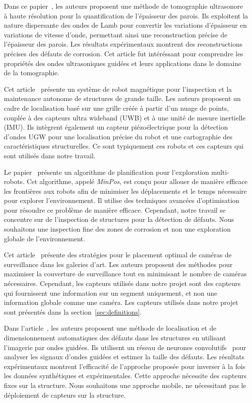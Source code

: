\documentclass[francais,RandD]{rapportPFE}
\begin{document}
		Dans ce papier~\cite{HUTHWAITE2013979}, les auteurs proposent une méthode de tomographie ultrasonore à haute résolution pour la quantification de l'épaisseur des parois.
		Ils exploitent la nature dispersante des ondes de Lamb pour convertir les variations d'épaisseur en variations de vitesse d'onde, permettant ainsi une reconstruction précise de l'épaisseur des parois.
		Les résultats expérimentaux montrent des reconstructions précises des défauts de corrosion.
		Cet article fut intéréssant pour comprendre les propriétés des ondes ultrasoniques guidées et leurs applications dans le domaine de la tomographie.

		Cet article~\cite{s22093235} présente un système de robot magnétique pour l'inspection et la maintenance autonome de structures de grande taille.
		Les auteurs proposent un cadre de localisation basé sur une grille créée à partir d'un nuage de points, couplée à des capteurs ultra wideband (UWB) et à une unité de mesure inertielle (IMU).
		Ils intègrent également un capteur piézoélectrique pour la détection d'ondes UGW pour une localisation précise du robot et une cartographie des caractéristiques structurelles.
		Ce sont typiquement ces robots et ces capteurs qui sont utilisés dans notre travail.

		Le papier~\cite{bautin:hal-00757960} présente un algorithme de planification pour l'exploration multi-robots.
		Cet algorithme, appelé \textit{MinPos}, est conçu pour allouer de manière efficace les frontières aux robots afin de minimiser les déplacements et le temps nécessaire pour explorer l'environnement. Il utilise des techniques avancées d'optimisation pour résoudre ce problème de manière efficace.
		Cependant, notre travail se concentre sur de l'inspection de structures pour la détection de défauts.
		Nous souhaitons une inspection fine des zones de corrosion et non une exploration globale de l'environnement.

		Cet article~\cite{article455556} présente des stratégies pour le placement optimal de caméras de surveillance dans les galeries d'art.
		Les auteurs proposent des méthodes pour maximiser la couverture de surveillance tout en minimisant le nombre de caméras nécessaires.
		Cependant, les capteurs utilisés dans notre projet sont des capteurs qui fournissent une information sur un segment uniquement, et non une information globale comme une caméra.
		Les capteurs utilisés dans notre projet sont présentés dans la section~\ref{sec:definitions}.

		Dans l'article~\cite{articlesvsdf}, les auteurs proposent une méthode de localisation et de dimensionnement automatiques des défauts dans les structures en utilisant l'imagerie par ondes guidées.
		Ils utilisent un réseau de neurones convolutifs~\cite{enwiki:1159408824} pour analyser les signaux d'ondes guidées et estimer la taille des défauts.
		Les résultats expérimentaux montrent l'efficacité de l'approche proposée pour inverser à la fois les données synthétiques et expérimentales.
		Cette approche nécessite des capteurs fixes sur la structure.
		Nous souhaitons une approche mobile, ne nécessitant pas le déploiement de capteurs sur la structure.
\end{document}
